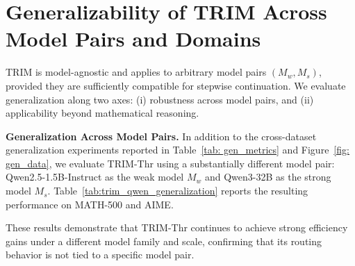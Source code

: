 \documentclass{article}
\theoremstyle{plain}
\theoremstyle{definition}
\theoremstyle{remark}
\begin{document}
\section{Generalizability of TRIM Across Model Pairs and Domains}
\label{sec:generalizability}
TRIM is model-agnostic and applies to arbitrary model pairs $(M_w, M_s)$, provided they are sufficiently compatible for stepwise continuation. We evaluate generalization along two axes: (i) robustness across model pairs, and (ii) applicability beyond mathematical reasoning.

\textbf{Generalization Across Model Pairs.} In addition to the cross-dataset generalization experiments reported in Table~\ref{tab: gen_metrics} and Figure~\ref{fig: gen_data}, we evaluate TRIM-Thr using a substantially different model pair: Qwen2.5-1.5B-Instruct as the weak model $M_w$ and Qwen3-32B as the strong model $M_s$. Table~\ref{tab:trim_qwen_generalization} reports the resulting performance on MATH-500 and AIME.

These results demonstrate that TRIM-Thr continues to achieve strong efficiency gains under a different model family and scale, confirming that its routing behavior is not tied to a specific model pair.
\end{document}
